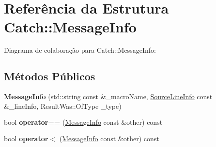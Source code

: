 \hypertarget{structCatch_1_1MessageInfo}{}\section{Referência da Estrutura Catch\+:\+:Message\+Info}
\label{structCatch_1_1MessageInfo}


Diagrama de colaboração para Catch\+:\+:Message\+Info\+:
\subsection*{Métodos Públicos}
\begin{DoxyCompactItemize}
\item 
{\bfseries Message\+Info} (std\+::string const \&\+\_\+macro\+Name, \hyperlink{structCatch_1_1SourceLineInfo}{Source\+Line\+Info} const \&\+\_\+line\+Info, Result\+Was\+::\+Of\+Type \+\_\+type)\hypertarget{structCatch_1_1MessageInfo_a2e336c33ebef7af3c1bbae6a56e14f8a}{}\label{structCatch_1_1MessageInfo_a2e336c33ebef7af3c1bbae6a56e14f8a}

\item 
bool {\bfseries operator==} (\hyperlink{structCatch_1_1MessageInfo}{Message\+Info} const \&other) const \hypertarget{structCatch_1_1MessageInfo_a30fe117138e568c5a9dfdabb7de6e790}{}\label{structCatch_1_1MessageInfo_a30fe117138e568c5a9dfdabb7de6e790}

\item 
bool {\bfseries operator$<$} (\hyperlink{structCatch_1_1MessageInfo}{Message\+Info} const \&other) const \hypertarget{structCatch_1_1MessageInfo_a7a2b1ec3772cd35176e2ee25a94be16a}{}\label{structCatch_1_1MessageInfo_a7a2b1ec3772cd35176e2ee25a94be16a}

\end{DoxyCompactItemize}
